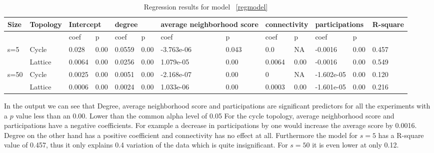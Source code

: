\begin{table}[!hbtp]
\centering
\begin{adjustbox}{width=1\textwidth}
\small
\begin{tabular}{@{}|l|l|l|l|l|l|l|l|l|l|l|l|l|@{}}
\toprule
Size & Topology & \multicolumn{2}{l|}{Intercept} & \multicolumn{2}{l|}{degree} & \multicolumn{2}{l|}{average neighborhood score} & \multicolumn{2}{l|}{connectivity} & \multicolumn{2}{l|}{participations} & R-square \\ \midrule
     &          & coef            & p            & coef          & p           & coef                      & p                    & coef             & p              & coef                & p             &          \\ \midrule
s=5  & Cycle    & 0.028           & 0.00         & 0.0559        & 0.00        & -3.763e-06                & 0.043                & 0.0              & NA             & -0.0016             & 0.00          & 0.457    \\ \midrule
     & Lattice  & 0.0064          & 0.00         & 0.0256        & 0.00        & 1.079e-05                 & 0.00                 & 0.0064           & 0.00           & -0.0016             & 0.00          & 0.549    \\ \midrule
s=50 & Cycle    & 0.0025          & 0.00         & 0.0051        & 0.00        & -2.168e-07                & 0.00                 & 0                & NA             & -1.602e-05          & 0.00          & 0.120    \\ \midrule
     & Lattice  & 0.0006          & 0.00         & 0.0024        & 0.00        & 1.033e-06                 & 0.00                 & 0.0003           & 0.00           & -1.601e-05          & 0.00          & 0.216    \\ \bottomrule
\end{tabular}
\end{adjustbox}
\caption{Regression results for model ~\ref{regmodel}}
\label{regression}
\end{table}

In the output we can see that Degree, average neighborhood score and participations
are significant predictors for all the experiments with a \(p\) value less than an 0.00.
Lower than the common alpha level of 0.05
For the cycle topology, average neighborhood score and participations have a negative
coefficients. For example a decrease in participations by one would increase
the average score by 0.0016. Degree on the other hand has a positive coefficient
and connectivity has no effect at all. Furthermore the model for \(s=5\) has
a R-square value of 0.457, thus it only explains 0.4 variation of the data which is
quite insignificant. For \(s=50\) it is even lower at only 0.12.

